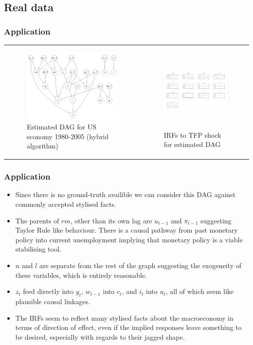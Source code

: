 \documentclass{beamer}
\begin{document}
\subsection{Real data}
\begin{frame}
    \frametitle{Application}
    \begin{tabular}{ p{5cm} p{5cm} }
        \begin{figure}
            \centering
            \includegraphics[width=5cm]{images/real_hybrid_structure.png}
            \caption{Estimated DAG for US economy 1980-2005 (hybrid algorithm)}
            \label{dag11}
          \end{figure}
        &
        \begin{figure}
            \centering
            \includegraphics[width=5cm,height=4cm]{images/real_z_irf.png}
            \caption{IRFs to TFP shock for estimated DAG}
            \label{dag12}
          \end{figure}
    \end{tabular}
\end{frame}

\begin{frame}
    \frametitle{Application}
    \begin{itemize}
        \item Since there is no ground-truth availible we can consider this DAG against commonly accepted stylised facts.
        \item The parents of $rm$, other than its own lag are $u_{t-1}$ and $\pi_{t-1}$ suggesting Taylor Rule like behaviour. There is a causal pathway from past monetary policy into current unemployment implying that monetary policy is a viable stabilising tool. 
        \item $n$ and $l$ are separate from the rest of the graph suggesting the exogeneity of these variables, which is entirely reasonable. 
        \item $z_t$ feed directly into $y_t$, $w_{t-1}$ into $c_t$, and $i_t$ into $u_t$, all of which seem like plausible causal linkages.
        \item The IRFs seem to reflect many stylised facts about the macroeconomy in terms of direction of effect, even if the implied responses leave something to be desired, especially with regards to their jagged shape. 
    \end{itemize}
\end{frame}
\end{document}
